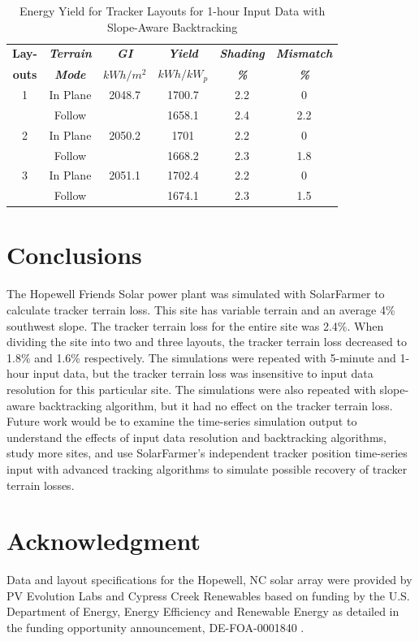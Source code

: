\documentclass[conference]{IEEEtran}
\begin{document}
\begin{table}[htbp]
\caption{Energy Yield for Tracker Layouts for 1-hour Input Data with Slope-Aware Backtracking}
\begin{center}
\begin{tabular}{|c|c|c|c|c|c|}
\hline
\textbf{Lay-}& \textbf{\textit{Terrain}}& \textbf{\textit{GI}}&        \textbf{\textit{Yield}}&        \textbf{\textit{Shading}}& \textbf{\textit{Mismatch}} \\
\textbf{outs}& \textbf{\textit{Mode}}&    \textbf{\textit{$kWh/m^2$}}& \textbf{\textit{$kWh / kW_p$}}& \textbf{\textit{\%}}&      \textbf{\textit{\%}} \\
\hline
1& In Plane& 2048.7&  1700.7& 2.2& 0 \\
 & Follow&         &  1658.1& 2.4& 2.2 \\
\hline
2& In Plane& 2050.2&  1701&   2.2& 0 \\
 & Follow&         &  1668.2& 2.3& 1.8 \\
\hline
3& In Plane& 2051.1&  1702.4& 2.2& 0 \\
 & Follow&         &  1674.1& 2.3& 1.5 \\
\hline
\end{tabular}
\label{table:slope-1hr}
\end{center}
\end{table}

\section{Conclusions}
The Hopewell Friends Solar power plant was simulated with SolarFarmer to calculate tracker terrain loss. This site has variable terrain and an average 4\% southwest slope. The tracker terrain loss for the entire site was 2.4\%. When dividing the site into two and three layouts, the tracker terrain loss decreased to 1.8\% and 1.6\% respectively. The simulations were repeated with 5-minute and 1-hour input data, but the tracker terrain loss was insensitive to input data resolution for this particular site. The simulations were also repeated with slope-aware backtracking algorithm, but it had no effect on the tracker terrain loss. Future work would be to examine the time-series simulation output to understand the effects of input data resolution and backtracking algorithms, study more sites, and use SolarFarmer's independent tracker position time-series input with advanced tracking algorithms to simulate possible recovery of tracker terrain losses.

\section*{Acknowledgment}

Data and layout specifications for the Hopewell, NC solar array were provided by PV Evolution Labs and Cypress Creek Renewables based on funding by the U.S. Department of Energy, Energy Efficiency and Renewable Energy as detailed in the funding opportunity announcement, DE-FOA-0001840 \cite{CypressCreekRenewables2019}.



\end{document}

